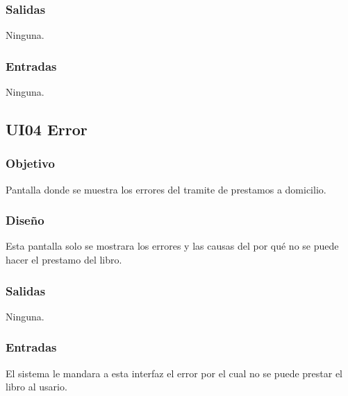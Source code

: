 
\subsubsection{Salidas}
	\begin{Citemize}
		\item Ninguna. 
	\end{Citemize}
	
\subsubsection{Entradas}
	\begin{Citemize}
		\item Ninguna.
	\end{Citemize}


\newpage
\subsection{UI04 Error}

\subsubsection{Objetivo}
	Pantalla donde se muestra los errores del tramite de prestamos a domicilio.

\subsubsection{Diseño}
	Esta pantalla solo se mostrara los errores y las causas del por qué no se puede hacer el prestamo del libro.


\subsubsection{Salidas}
	\begin{Citemize}
		\item Ninguna. 
	\end{Citemize}
	
\subsubsection{Entradas}
	\begin{Citemize}
		\item El sistema le mandara a esta interfaz el error por el cual no se puede prestar el libro al usario.
	\end{Citemize}

